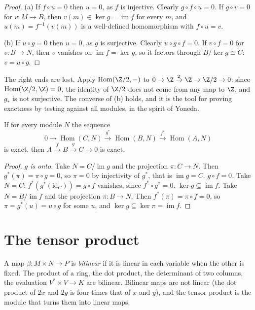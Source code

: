 \begin{proof}
(a) If $f\circ u=0$ then $u=0$, as $f$ is injective. Clearly $g\circ f\circ u=0$. If $g\circ v=0$ for $v\colon M\to B$, then $v(m)\in\ker g=\operatorname{im}f$ for every $m$, and $u(m)=f^{-1}(v(m))$ is a well-defined homomorphism with $f\circ u=v$.

(b) If $u\circ g=0$ then $u=0$, as $g$ is surjective. Clearly $u\circ g\circ f=0$. If $v\circ f=0$ for $v\colon B\to N$, then $v$ vanishes on $\operatorname{im}f=\ker g$, so it factors through $B/\ker g\cong C$: $v=u\circ g$.
\end{proof}

The right ends are lost. Apply $\operatorname{Hom}(\Z/2,-)$ to $0\to\Z\xrightarrow2\Z\to\Z/2\to0$: since $\operatorname{Hom}(\Z/2,\Z)=0$, the identity of $\Z/2$ does not come from any map to $\Z$, and $g_*$ is not surjective. The
converse of (b) holds, and it is the tool for proving exactness by testing against all modules, in the spirit of Yoneda.

\begin{lemma}\label{lem:testexact}
If for every module $N$ the sequence
\[0\to\operatorname{Hom}(C,N)\xrightarrow{g^*}\operatorname{Hom}(B,N)\xrightarrow{f^*}\operatorname{Hom}(A,N)\]
is exact, then $A\xrightarrow fB\xrightarrow gC\to0$ is exact.
\end{lemma}

\begin{proof}
\emph{$g$ is onto.} Take $N=C/\operatorname{im}g$ and the projection $\pi\colon C\to N$. Then $g^*(\pi)=\pi\circ g=0$, so $\pi=0$ by injectivity of $g^*$, that is $\operatorname{im}g=C$.
\emph{$g\circ f=0$.} Take $N=C$: $f^*(g^*(\mathrm{id}_C))=g\circ f$ vanishes, since $f^*\circ g^*=0$.
\emph{$\ker g\subseteq\operatorname{im}f$.} Take $N=B/\operatorname{im}f$ and the projection $\pi\colon B\to N$. Then $f^*(\pi)=\pi\circ f=0$, so $\pi=g^*(u)=u\circ g$ for some $u$, and $\ker g\subseteq\ker\pi=\operatorname{im}f$.
\end{proof}

\section{The tensor product}

A map $\beta\colon M\times N\to P$ is \emph{bilinear} if it is linear in each variable when the other is fixed. The product of a ring, the dot product, the determinant of two columns, the evaluation $V^*\times V\to K$
are bilinear. Bilinear maps are not linear (the dot product of $2x$ and $2y$ is four times that of $x$ and $y$), and the tensor product is the module that turns them into linear maps.

